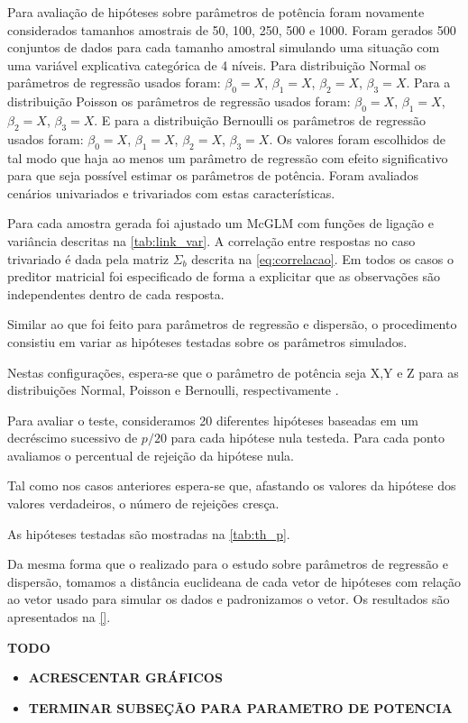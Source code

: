 Para avaliação de hipóteses sobre parâmetros de potência foram novamente considerados tamanhos amostrais de 50, 100, 250, 500 e 1000. Foram gerados 500 conjuntos de dados para cada tamanho amostral simulando uma situação com uma variável explicativa categórica de 4 níveis. Para distribuição Normal os parâmetros de regressão usados foram: $\beta_0 = X$, $\beta_1 = X$, $\beta_2 = X$, $\beta_3 = X$. Para a distribuição Poisson os parâmetros de regressão usados foram: $\beta_0 = X$, $\beta_1 = X$, $\beta_2 = X$, $\beta_3 = X$. E para a distribuição Bernoulli os parâmetros de regressão usados foram: $\beta_0 = X$, $\beta_1 = X$, $\beta_2 = X$, $\beta_3 = X$. Os valores foram escolhidos de tal modo que haja ao menos um parâmetro de regressão com efeito significativo para que seja possível estimar os parâmetros de potência. Foram avaliados cenários univariados e trivariados com estas características.

Para cada amostra gerada foi ajustado um McGLM com funções de ligação e variância descritas na \autoref{tab:link_var}. A correlação entre respostas no caso trivariado é dada pela matriz $\Sigma_b$ descrita na \autoref{eq:correlacao}. Em todos os casos o preditor matricial foi especificado de forma a explicitar que as observações são independentes dentro de cada resposta.

Similar ao que foi feito para parâmetros de regressão e dispersão, o procedimento consistiu em variar as hipóteses testadas sobre os parâmetros simulados. 

Nestas configurações, espera-se que o parâmetro de potência seja X,Y e Z para as distribuições Normal, Poisson e Bernoulli, respectivamente .

Para avaliar o teste, consideramos 20 diferentes hipóteses baseadas em um decréscimo sucessivo de $p/20$ para cada hipótese nula testeda. Para cada ponto avaliamos o percentual de rejeição da hipótese nula. 

Tal como nos casos anteriores espera-se que, afastando os valores da hipótese dos valores verdadeiros, o número de rejeições cresça.

As hipóteses testadas são mostradas na \autoref{tab:th_p}.


Da mesma forma que o realizado para o estudo sobre parâmetros de regressão e dispersão,  tomamos a distância euclideana de cada vetor de hipóteses com relação ao vetor usado para simular os dados e padronizamos o vetor. Os resultados são apresentados na \autoref{}.


\textbf{TODO}

\begin{itemize}
  
  \item \textbf{ACRESCENTAR GRÁFICOS}
  
  \item \textbf{TERMINAR SUBSEÇÃO PARA PARAMETRO DE POTENCIA}
  
\end{itemize}



